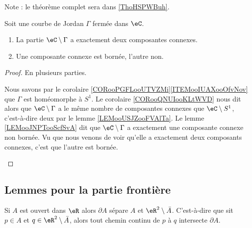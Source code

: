 Note : le théorème complet sera dans \ref{ThoHSPWBuh}.

\begin{theorem}			\label{THOooDZDIooGNMCjs}
	Soit une courbe de Jordan \( \Gamma\) fermée dans \( \eC\).
	\begin{enumerate}
		\item		\label{ITEMooOAKXooMirWiD}
		      La partie \( \eC\setminus \Gamma\) a exactement deux composantes connexes.
		\item	\label{ITEMooICBGooXHMALK}
		      Une composante connexe est bornée, l'autre non.
	\end{enumerate}
\end{theorem}


\begin{proof}
	En plusieurs parties.
	\begin{subproof}
		Nous savons par le corolaire \ref{CORooPGFLooUTVZMi}\ref{ITEMooIUAXooOfvNov} que \( \Gamma\) est homéomorphe à \( S^1\). Le corolaire \ref{CORooQNUIooKLtWVD} nous dit alors que \( \eC\setminus \Gamma\) a le même nombre de composantes connexes que \( \eC\setminus S^1\), c'est-à-dire deux par le lemme \ref{LEMooUSJZooFVAlTa}.
		Le lemme \ref{LEMooJNPTooScfSvA} dit que \( \eC\setminus \Gamma\) a exactement une composante connexe non bornée. Vu que nous venons de voir qu'elle a exactement deux composants connexes, c'est que l'autre est bornée.
	\end{subproof}
\end{proof}



\subsection{Lemmes pour la partie frontière}


\begin{proposition}
	Si \( A\) est ouvert dans \( \eR\) alors \( \partial A\) sépare \( A\) et \( \eR^2\setminus \bar A\). C'est-à-dire que sit \( p\in A\) et \( q\in \eR^2\setminus\bar A\), alors tout chemin continu de \( p\) à \( q\) intersecte \( \partial A\).
\end{proposition}

